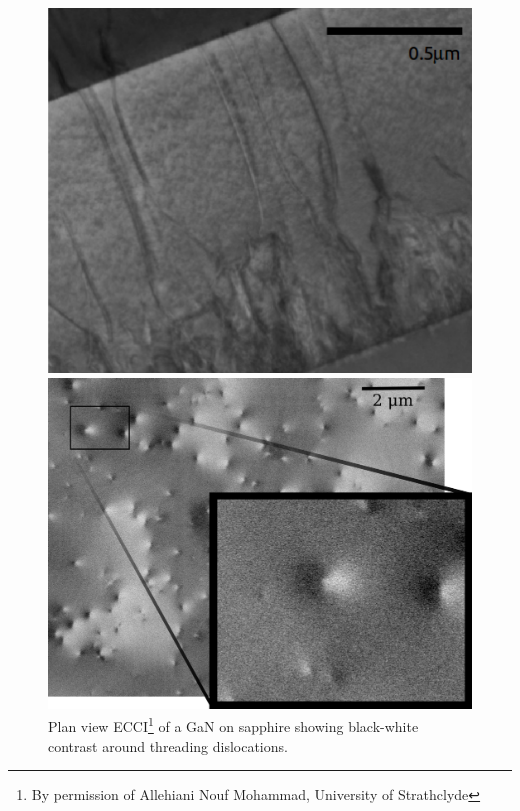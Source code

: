\begin{figure}
\centering
\noindent\begin{minipage}{0.47\textwidth}
    \centering
    \includegraphics[width=0.9\linewidth, height=0.25\textheight]{Figures/TEM.png}
    \captionsetup{width=0.8\linewidth}
    \caption[AlGaN TEM.]{Transversal TEM image\footnote{Taken at the Kelvin Nanocharacterisation Center, University of Glasgow. ~~By permission of David Thomson, University of Strathclyde} of an AlGaN on sapphire showing threading dislocations reaching an interface.}
     \label{fig:tem}
\end{minipage}
\;\;\;
\begin{minipage}{0.48\textwidth}
     \centering
     \includegraphics[width=0.9\linewidth, height=0.25\textheight]{Figures/ECCI.png}
      \captionsetup{width=0.8\linewidth}
     \caption[GaN ECCI.]{Plan view ECCI\footnote{By permission of Allehiani Nouf Mohammad, University of Strathclyde} of a \hkl[0001] GaN on sapphire showing black-white contrast around threading dislocations.}
     \label{fig:ecci}
\end{minipage}
\end{figure}

